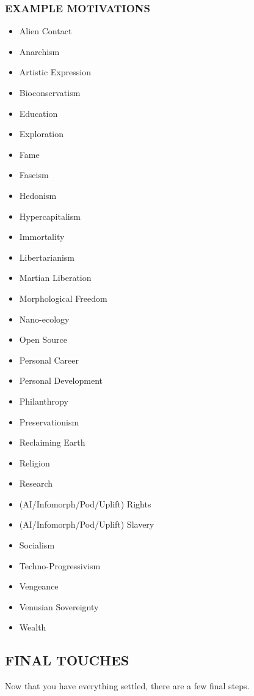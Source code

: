 \subsubsection{EXAMPLE MOTIVATIONS}
\begin{itemize}
\item Alien Contact
\item Anarchism
\item Artistic Expression
\item Bioconservatism
\item Education
\item Exploration
\item Fame
\item Fascism
\item Hedonism
\item Hypercapitalism
\item Immortality
\item Libertarianism
\item Martian Liberation
\item Morphological Freedom
\item Nano-ecology
\item Open Source
\item Personal Career
\item Personal Development
\item Philanthropy
\item Preservationism
\item Reclaiming Earth
\item Religion
\item Research
\item (AI/Infomorph/Pod/Uplift) Rights
\item (AI/Infomorph/Pod/Uplift) Slavery
\item Socialism
\item Techno-Progressivism
\item Vengeance
\item Venusian Sovereignty
\item Wealth
\end{itemize}

\subsection{FINAL TOUCHES}

Now that you have everything settled, there are a few
final steps.
